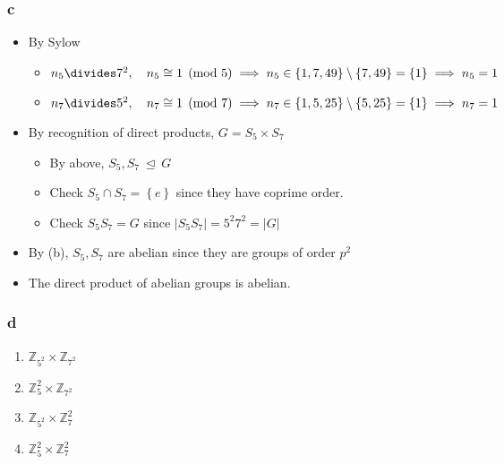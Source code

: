\begin{solution}
\hypertarget{c-14}{%
\subsubsection{c}\label{c-14}}

\begin{itemize}
\item
  By Sylow

  \begin{itemize}
  \tightlist
  \item
    \(n_5 \divides 7^2,\quad n_5\cong 1\pmod 5 \implies n_5\in\left\{{1, 7, 49}\right\}\setminus\left\{{7, 49}\right\} = \left\{{1}\right\} \implies n_5 = 1\)
  \item
    \(n_7 \divides 5^2, \quad n_7 \cong 1 \pmod 7 \implies n_7 \in \left\{{1, 5, 25}\right\}\setminus\left\{{5, 25}\right\} =\left\{{1}\right\} \implies n_7 = 1\)
  \end{itemize}
\item
  By recognition of direct products, \(G = S_5 \times S_7\)

  \begin{itemize}
  \tightlist
  \item
    By above, \(S_5, S_7{~\trianglelefteq~}G\)
  \item
    Check \(S_5\cap S_7 = \left\{{e}\right\}\) since they have coprime
    order.
  \item
    Check \(S_5S_7 = G\) since
    \({\left\lvert {S_5 S_7} \right\rvert} = 5^2 7^2 = {\left\lvert {G} \right\rvert}\)
  \end{itemize}
\item
  By (b), \(S_5, S_7\) are abelian since they are groups of order
  \(p^2\)
\item
  The direct product of abelian groups is abelian.
\end{itemize}

\hypertarget{d-6}{%
\subsubsection{d}\label{d-6}}

\begin{enumerate}
\def\labelenumi{\arabic{enumi}.}
\tightlist
\item
  \({\mathbb{Z}}_{5^2} \times{\mathbb{Z}}_{7^2}\)
\item
  \({\mathbb{Z}}_{5}^2 \times{\mathbb{Z}}_{7^2}\)
\item
  \({\mathbb{Z}}_{5^2} \times{\mathbb{Z}}_{7}^2\)
\item
  \({\mathbb{Z}}_{5}^2 \times{\mathbb{Z}}_{7}^2\)
\end{enumerate}

\end{solution}

